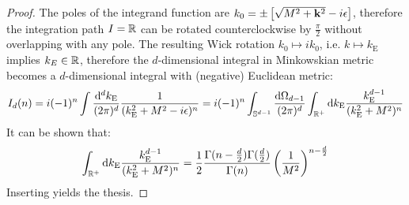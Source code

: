 \begin{proofbox}
  \begin{proof}
    The poles of the integrand function are $ k_0 = \pm \left[ \sqrt{M^2 + \mathbf{k}^2} - i\epsilon \right] $, therefore the integration path $ I = \mathbb{R} $ can be rotated counterclockwise by $ \frac{\pi}{2} $ without overlapping with any pole. The resulting Wick rotation $ k_0 \mapsto i k_0 $, i.e. $ k \mapsto k_\text{E} $ implies $ k_E \in \mathbb{R} $, therefore the $ d $-dimensional integral in Minkowskian metric becomes a $ d $-dimensional integral with (negative) Euclidean metric:
    \begin{equation*}
      I_d(n) = i (-1)^n \int \frac{\mathrm{d}^dk_\text{E}}{(2\pi)^d} \frac{1}{(k_\text{E}^2 + M^2 - i\epsilon)^n} = i (-1)^n \int_{\mathbb{S}^{d-1}} \frac{\mathrm{d} \Omega_{d-1}}{(2\pi)^d} \int_{\mathbb{R}^+} \mathrm{d} k_\text{E} \frac{k_\text{E}^{d-1}}{(k_\text{E}^2 + M^2)^n}
    \end{equation*}
    It can be shown that:
    \begin{equation}
      \int_{\mathbb{R}^+} \mathrm{d} k_\text{E} \frac{k_\text{E}^{d-1}}{(k_\text{E}^2 + M^2)^n} = \frac{1}{2} \frac{\Gamma(n - \frac{d}{2}) \Gamma(\frac{d}{2})}{\Gamma(n)} \left( \frac{1}{M^2} \right)^{n - \frac{d}{2}}
    \end{equation}
    Inserting  yields the thesis.
  \end{proof}
\end{proofbox}

